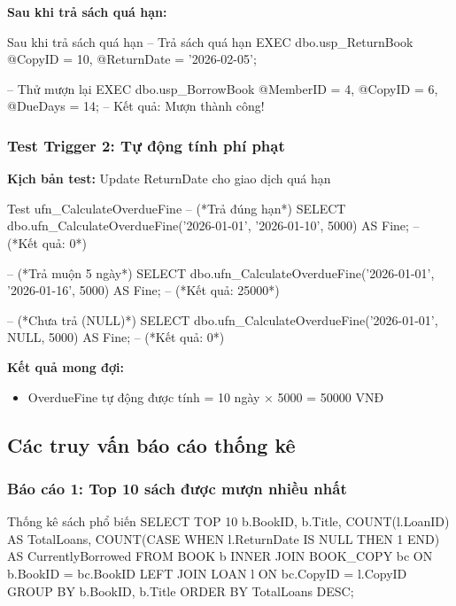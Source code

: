 \documentclass[12pt,a4paper]{article}
\begin{document}
\textbf{Sau khi trả sách quá hạn:}
\begin{sqlcode}{Sau khi trả sách quá hạn}
-- Trả sách quá hạn
EXEC dbo.usp_ReturnBook @CopyID = 10, @ReturnDate = '2026-02-05';

-- Thử mượn lại
EXEC dbo.usp_BorrowBook @MemberID = 4, @CopyID = 6, @DueDays = 14;
-- Kết quả: Mượn thành công!
\end{sqlcode}

\subsubsection{Test Trigger 2: Tự động tính phí phạt}

\textbf{Kịch bản test:} Update ReturnDate cho giao dịch quá hạn

\begin{sqlcode}{Test ufn_CalculateOverdueFine}
-- (*Trả đúng hạn*)
SELECT dbo.ufn_CalculateOverdueFine('2026-01-01', '2026-01-10', 5000) AS Fine;
-- (*Kết quả: 0*)

-- (*Trả muộn 5 ngày*)
SELECT dbo.ufn_CalculateOverdueFine('2026-01-01', '2026-01-16', 5000) AS Fine;
-- (*Kết quả: 25000*)

-- (*Chưa trả (NULL)*)
SELECT dbo.ufn_CalculateOverdueFine('2026-01-01', NULL, 5000) AS Fine;
-- (*Kết quả: 0*)
\end{sqlcode}

\textbf{Kết quả mong đợi:}
\begin{itemize}
    \item OverdueFine tự động được tính = 10 ngày × 5000 = 50000 VNĐ
\end{itemize}

\subsection{Các truy vấn báo cáo thống kê}

\subsubsection{Báo cáo 1: Top 10 sách được mượn nhiều nhất}

\begin{sqlcode}{Thống kê sách phổ biến}
SELECT TOP 10
    b.BookID,
    b.Title,
    COUNT(l.LoanID) AS TotalLoans,
    COUNT(CASE WHEN l.ReturnDate IS NULL THEN 1 END) AS CurrentlyBorrowed
FROM BOOK b
INNER JOIN BOOK_COPY bc ON b.BookID = bc.BookID
LEFT JOIN LOAN l ON bc.CopyID = l.CopyID
GROUP BY b.BookID, b.Title
ORDER BY TotalLoans DESC;
\end{sqlcode}
\end{document}
